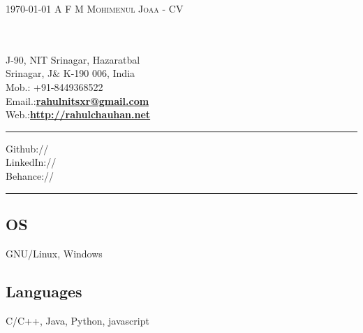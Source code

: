\documentclass[localFont,alternative,10pt,compact]{main}
\begin{document}
    \makecvfooter
    {\textsc{\today}} %
    {\textsc{A F M Mohimenul Joaa - CV}}
    {\thepage}

%
%


    \begin{minipage}[t]{0.33\textwidth}
        \hspace*{0pt}\hfill    \\
        \hspace*{0pt}\hfill    \\
        J-90, NIT Srinagar, Hazaratbal \\
        Srinagar, J$\&$ K-190 006, India \\
        Mob.: +91-8449368522 \\
        Email.:\textbf{\href{mailto:rahulnitsxr@gmail.com}{rahulnitsxr@gmail.com}} \\
        Web.:\textbf{\href{http://rahulchauhan.net}{http://rahulchauhan.net}}

        \noindent\rule{5cm}{0.4pt}

        Github:// \href{https://github.com/rahulworld}{} \\
        LinkedIn://  \href{https://www.linkedin.com/in/rahulworld}{} \\
        Behance://  \href{https://www.behance.net/rahul_world}{}

        \noindent\rule{5cm}{0.4pt}

        \vspace{0.2cm}
        \subsection{OS}
        GNU/Linux, Windows
        \vspace{6pt}

        \subsection{Languages}
        C/C++, Java, Python, javascript
        \vspace{6pt}


\end{minipage}
\end{document}
